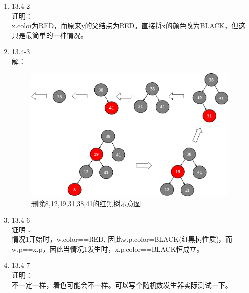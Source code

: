 \documentclass[UTF8]{ctexart}
\begin{document}
\begin{enumerate}
	\item 13.4-2 \\
	证明：\\
		x.color为RED，而原来y的父结点为RED。直接将x的颜色改为BLACK，但这只是最简单的一种情况。
	
	\item 13.4-3 \\
	解：\\
		\begin{figure}[H]
		\centering
        \caption{删除8,12,19,31,38,41的红黑树示意图}
		\includegraphics[scale=0.65]{13_4_3.png}
		\end{figure}
	
	\item 13.4-6 \\	
	证明：\\
		情况1开始时，w.color==RED, 因此w.p.color=BLACK(红黑树性质)，而w.p==x.p，因此当情况1发生时，x.p.color==BLACK恒成立。
		
	\item 13.4-7 \\
	证明：\\
		不一定一样，着色可能会不一样。可以写个随机数发生器实际测试一下。
	
\end{enumerate}
\end{document}
